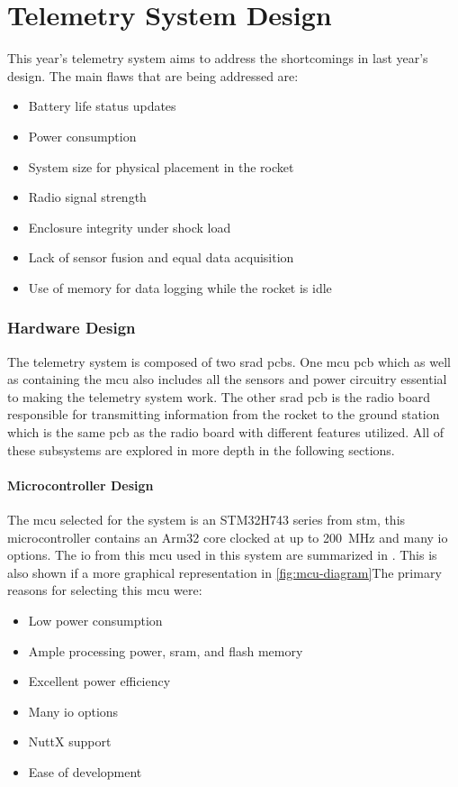 \part{Telemetry System Design}

This year's telemetry system aims to address the shortcomings in last year's design. The main flaws that are being
addressed are:

\begin{itemize}
    \item Battery life status updates
    \item Power consumption
    \item System size for physical placement in the rocket
    \item Radio signal strength
    \item Enclosure integrity under shock load
    \item Lack of sensor fusion and equal data acquisition
    \item Use of memory for data logging while the rocket is idle
\end{itemize}

\section{Hardware Design}
The telemetry system is composed of two \gls{srad} \gls{pcb}s. One \gls{mcu} \gls{pcb} which as well as containing the \gls{mcu} also includes all the sensors and power circuitry essential to making the telemetry system work. The other \gls{srad} \gls{pcb} is the radio board responsible for transmitting information from the rocket to the ground station which is the same \gls{pcb} as the radio board with different features utilized. All of these subsystems are explored in more depth in the following sections.


\subsection{Microcontroller Design}
The \gls{mcu} selected for the system is an STM32H743 series from \gls{stm}, this microcontroller contains an Arm32 core clocked at up to \qty{200}{\mega\hertz} and many \gls{io} options. The \gls{io} from this \gls{mcu} used in this system are summarized in . This is also shown if a more graphical representation in \cref{fig:mcu-diagram}The primary reasons for selecting this \gls{mcu} were: \begin{itemize}
    \item Low power consumption
    \item Ample processing power, \gls{sram}, and flash memory
    \item Excellent power efficiency
    \item Many \gls{io} options
    \item NuttX support
    \item Ease of development
\end{itemize}

